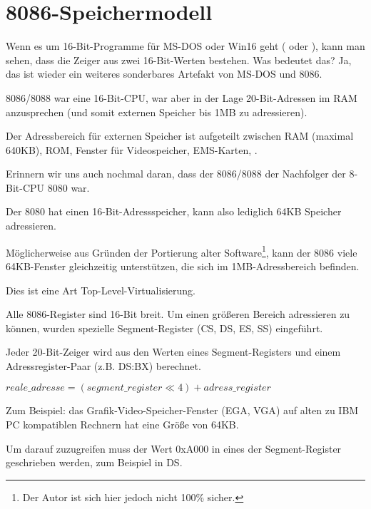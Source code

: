\section{8086-Speichermodell}
\label{8086_memory_model}

Wenn es um 16-Bit-Programme für MS-DOS oder Win16 geht (
oder ), kann man sehen, dass die Zeiger aus zwei
16-Bit-Werten bestehen.
Was bedeutet das? Ja, das ist wieder ein weiteres sonderbares Artefakt von MS-DOS
und 8086.

8086/8088 war eine 16-Bit-CPU, war aber in der Lage 20-Bit-Adressen im RAM anzusprechen
(und somit externen Speicher bis 1MB zu adressieren).

Der Adressbereich für externen Speicher ist aufgeteilt zwischen \ac{RAM} (maximal 640KB),
\ac{ROM}, Fenster für Videospeicher, EMS-Karten, \etc{}.

Erinnern wir uns auch nochmal daran, dass der 8086/8088 der Nachfolger der 8-Bit-CPU
8080 war.

Der 8080 hat einen 16-Bit-Adressspeicher, kann also lediglich 64KB Speicher adressieren.

Möglicherweise aus Gründen der Portierung alter Software\footnote{Der Autor ist sich hier jedoch nicht 100\% sicher.},
kann der 8086 viele 64KB-Fenster gleichzeitig unterstützen, die sich im 1MB-Adressbereich
befinden.

Dies ist eine Art Top-Level-Virtualisierung.

Alle 8086-Register sind 16-Bit breit. Um einen größeren Bereich adressieren zu können,
wurden spezielle Segment-Register (CS, DS, ES, SS)  eingeführt.

Jeder 20-Bit-Zeiger wird aus den Werten eines Segment-Registers und einem
Adressregister-Paar (z.B. DS:BX) berechnet.

\begin{center}
$reale\_adresse = (segment\_register \ll 4) + adress\_register$
\end{center}

Zum Beispiel: das Grafik-Video-Speicher-Fenster (\ac{EGA}, \ac{VGA}) auf alten zu
IBM PC kompatiblen Rechnern hat eine Größe von 64KB.

Um darauf zuzugreifen muss der Wert 0xA000 in eines der Segment-Register geschrieben
werden, zum Beispiel in DS.

